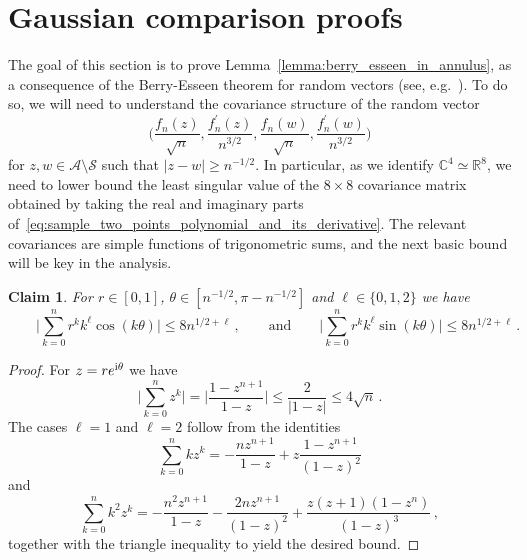 \documentclass[11pt]{amsart}
\newtheorem{claim}[theorem]{Claim}
\theoremstyle{remark}
\theoremstyle{definition}
\newcommand{\bR}{\mathbb R}
\newcommand{\bC}{\mathbb C}
\newcommand{\cA}{\mathcal A}
\newcommand{\I}{{\rm i}}
\begin{document}
    \section{Gaussian comparison proofs}
    \label{sec:gaussian_comparison}
    \noindent
    The goal of this section is to prove Lemma~\ref{lemma:berry_esseen_in_annulus}, as a consequence of the Berry-Esseen theorem for random vectors (see, e.g.~\cite[Corollary~17.2]{Bhattacharya-Rao}). To do so, we will need to understand the covariance structure of the random vector
    \begin{equation}
    \label{eq:sample_two_points_polynomial_and_its_derivative}
    \Big( \frac{f_n(z)}{\sqrt{n}} , \frac{f_n^\prime(z)}{n^{3/2}} ,  \frac{f_n(w)}{\sqrt{n}} , \frac{f_n^\prime(w)}{n^{3/2}} \Big)    
    \end{equation}
    for $z,w\in \cA\setminus \mathcal{S}$ such that $|z-w|\ge n^{-1/2}$. In particular, as we identify $\bC^4\simeq \bR^8$, we need to lower bound the least singular value of the $8\times 8$ covariance matrix obtained by taking the real and imaginary parts of~\eqref{eq:sample_two_points_polynomial_and_its_derivative}. The relevant covariances are simple functions of trigonometric sums, and the next basic bound will be key in the analysis. 
    \begin{claim}
        \label{claim:bound_on_trig_sums}
        For $r\in[0,1]$, $\theta \in [n^{-1/2},\pi-n^{-1/2}]$ and $\ell\in\{0,1,2\}$ we have
        \[
        \qquad \bigg|\sum_{k=0}^n r^k k^\ell \cos(k\theta) \bigg| \le 8n^{1/2+\ell} \, , \qquad \text{and} \qquad \bigg|\sum_{k=0}^n r^k k^\ell \sin(k\theta) \bigg| \le 8n^{1/2+\ell} \, .
        \]
    \end{claim}
    \begin{proof}
        For $z=re^{\I\theta}$ we have
        \[
        \Big| \sum_{k=0}^{n} z^k\Big| = \Big| \frac{1-z^{n+1}}{1-z} \Big| \le \frac{2}{|1-z|} \le 4 \sqrt{n} \, .
        \]
        The cases $\ell =1$ and $\ell=2$ follow from the identities
        \[
        \sum_{k=0}^n k z^k = -\frac{nz^{n+1}}{1-z} + z\frac{1-z^{n+1}}{(1-z)^2} 
        \]
        and
        \[
        \sum_{k=0}^{n} k^2 z^k = -\frac{n^2 z^{n+1}}{1-z} -\frac{2nz^{n+1}}{(1-z)^2} + \frac{z(z+1)(1-z^n)}{(1-z)^3} \, ,
        \]
        together with the triangle inequality to yield the desired bound. 
    \end{proof}
    
\end{document}
